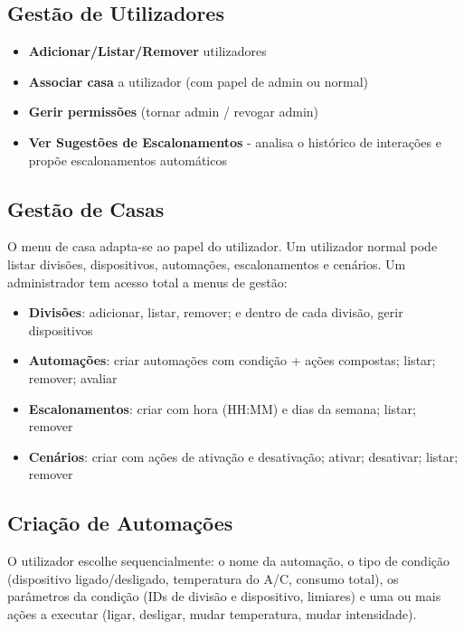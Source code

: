 \documentclass[a4paper]{article}
\begin{document}
\subsection{Gestão de Utilizadores}

\begin{itemize}
    \item \textbf{Adicionar/Listar/Remover} utilizadores
    \item \textbf{Associar casa} a utilizador (com papel de admin ou normal)
    \item \textbf{Gerir permissões} (tornar admin / revogar admin)
    \item \textbf{Ver Sugestões de Escalonamentos} - analisa o histórico de interações e propõe escalonamentos automáticos
\end{itemize}

\subsection{Gestão de Casas}

O menu de casa adapta-se ao papel do utilizador. Um utilizador normal pode listar divisões, dispositivos, automações, escalonamentos e cenários. Um administrador tem acesso total a menus de gestão:

\begin{itemize}
    \item \textbf{Divisões}: adicionar, listar, remover; e dentro de cada divisão, gerir dispositivos
    \item \textbf{Automações}: criar automações com condição + ações compostas; listar; remover; avaliar
    \item \textbf{Escalonamentos}: criar com hora (HH:MM) e dias da semana; listar; remover
    \item \textbf{Cenários}: criar com ações de ativação e desativação; ativar; desativar; listar; remover
\end{itemize}

\subsection{Criação de Automações}

O utilizador escolhe sequencialmente: o nome da automação, o tipo de condição (dispositivo ligado/desligado, temperatura do A/C, consumo total), os parâmetros da condição (IDs de divisão e dispositivo, limiares) e uma ou mais ações a executar (ligar, desligar, mudar temperatura, mudar intensidade).
\end{document}

